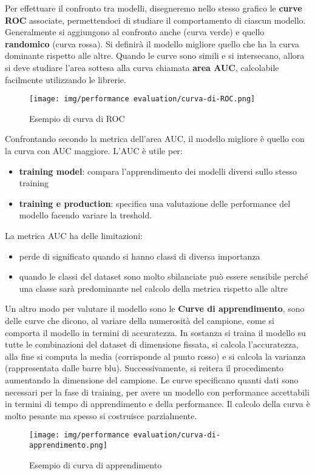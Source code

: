 Per effettuare il confronto tra modelli, disegneremo nello stesso grafico le
\textbf{curve ROC} associate, permettendoci di studiare il comportamento di ciascun
modello. Generalmente si aggiungono al confronto anche  (curva verde) e quello \textbf{randomico} (curva rossa). Si definirà
il modello migliore quello che ha la curva dominante rispetto alle altre. Quando
le curve sono simili e si intersecano, allora si deve studiare l'area sottesa
alla curva chiamata \textbf{area AUC}, calcolabile facilmente utilizzando le librerie.
\begin{figure}[!ht]
    \centering
    \texttt{[image: img/performance evaluation/curva-di-ROC.png]}
    \caption{Esempio di curva di ROC}
    \label{fig:curva-di-ROC}
\end{figure}
Confrontando secondo la metrica dell'area AUC, il modello
migliore è quello con la curva con AUC maggiore. L'AUC è utile per:
\begin{itemize}
    \item \textbf{training model}: compara l'apprendimento dei modelli diversi
          sullo stesso training
    \item \textbf{training e production}: specifica una valutazione delle performance
          del modello facendo variare la treshold.
\end{itemize}
La metrica AUC ha delle limitazioni:
\begin{itemize}
    \item perde di significato quando si hanno classi di diversa importanza
    \item quando le classi del dataset sono molto sbilanciate può essere sensibile
          perché una classe sarà predominante nel calcolo della metrica rispetto alle
          altre
\end{itemize}
Un altro modo per valutare il modello sono le \textbf{Curve di apprendimento},
sono delle curve che dicono, al variare della numerosità del campione, come si
comporta il modello in termini di accuratezza. In sostanza si traina il modello
su tutte le combinazioni del dataset di dimensione fissata, si calcola l'accuratezza,
alla fine si computa la media (corrisponde al punto rosso) e si calcola la varianza
(rappresentata dalle barre blu). Successivamente, si reitera il procedimento aumentando
la dimensione del campione. Le curve specificano quanti dati sono necessari per
la fase di training, per avere un modello con performance accettabili in termini
di tempo di apprendimento e della performance. Il calcolo della curva è molto
pesante ma spesso si costruisce parzialmente.
\begin{figure}[!ht]
    \centering
    \texttt{[image: img/performance evaluation/curva-di-apprendimento.png]}
    \caption{Esempio di curva di apprendimento}
    \label{fig:curva-di-apprendimento}
\end{figure}
